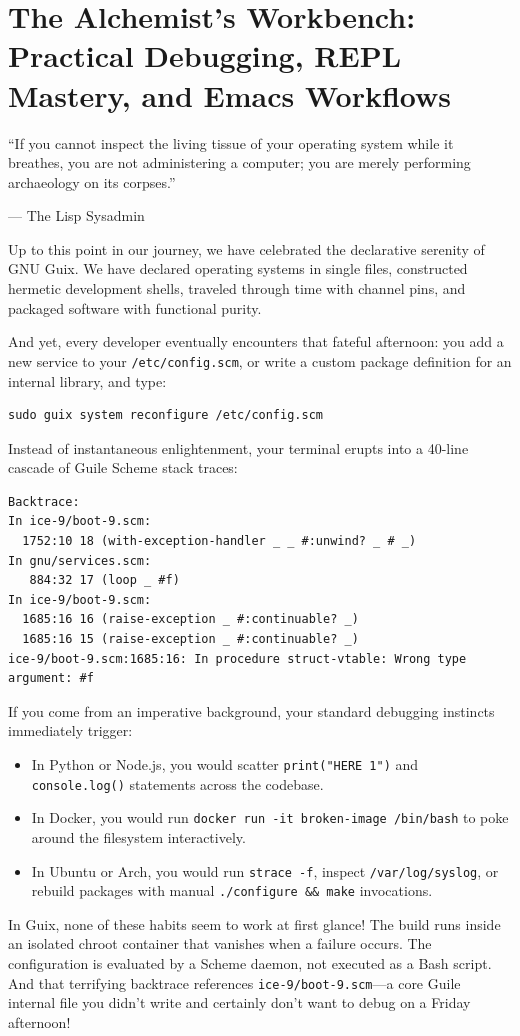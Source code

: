 \chapter{The Alchemist's Workbench: Practical Debugging, REPL Mastery, and Emacs Workflows}
\label{chap:debugging-and-repl}

\epigraph{``If you cannot inspect the living tissue of your operating system while it breathes, you are not administering a computer; you are merely performing archaeology on its corpses.''}{--- The Lisp Sysadmin}

\noindent
Up to this point in our journey, we have celebrated the declarative serenity of GNU Guix. We have declared operating systems in single files, constructed hermetic development shells, traveled through time with channel pins, and packaged software with functional purity.

And yet, every developer eventually encounters that fateful afternoon: you add a new service to your \texttt{/etc/config.scm}, or write a custom package definition for an internal library, and type:
\begin{lstlisting}[style=guixcli]
sudo guix system reconfigure /etc/config.scm
\end{lstlisting}

Instead of instantaneous enlightenment, your terminal erupts into a 40-line cascade of Guile Scheme stack traces:
\begin{lstlisting}[style=guixcli]
Backtrace:
In ice-9/boot-9.scm:
  1752:10 18 (with-exception-handler _ _ #:unwind? _ # _)
In gnu/services.scm:
   884:32 17 (loop _ #f)
In ice-9/boot-9.scm:
  1685:16 16 (raise-exception _ #:continuable? _)
  1685:16 15 (raise-exception _ #:continuable? _)
ice-9/boot-9.scm:1685:16: In procedure struct-vtable: Wrong type argument: #f
\end{lstlisting}

\begin{tearsbox}
If you come from an imperative background, your standard debugging instincts immediately trigger:
\begin{itemize}
  \item In Python or Node.js, you would scatter \texttt{print("HERE 1")} and \texttt{console.log()} statements across the codebase.
  \item In Docker, you would run \texttt{docker run -it broken-image /bin/bash} to poke around the filesystem interactively.
  \item In Ubuntu or Arch, you would run \texttt{strace -f}, inspect \texttt{/var/log/syslog}, or rebuild packages with manual \texttt{./configure \&\& make} invocations.
\end{itemize}
In Guix, none of these habits seem to work at first glance! The build runs inside an isolated chroot container that vanishes when a failure occurs. The configuration is evaluated by a Scheme daemon, not executed as a Bash script. And that terrifying backtrace references \texttt{ice-9/boot-9.scm}---a core Guile internal file you didn't write and certainly don't want to debug on a Friday afternoon!
\end{tearsbox}

